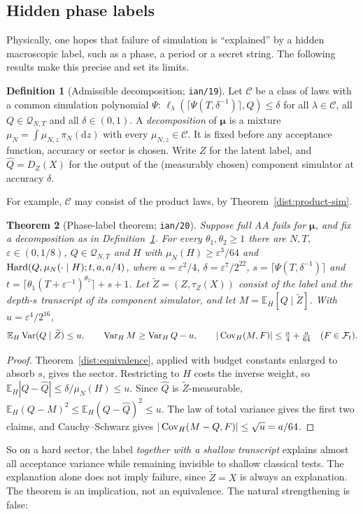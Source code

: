 \documentclass[11pt]{article}
\newtheorem{theorem}{Theorem}[section]
\theoremstyle{definition}\newtheorem{definition}[theorem]{Definition}
\theoremstyle{remark}\newtheorem{remark}[theorem]{Remark}
\newcommand{\E}{\mathbb E}\newcommand{\Prb}{\mathbb P}
\newcommand{\mc}{\mathcal}\newcommand{\eps}{\varepsilon}
\newcommand{\dd}{\mathrm d}\newcommand{\set}[1]{\left\{#1\right\}}
\begin{document}
\subsection{Hidden phase labels}\label{dist:phase}
Physically, one hopes that failure of simulation is ``explained'' by a hidden
macroscopic label, such as a phase, a period or a secret string. The following
results make this precise and set its limits.

\begin{definition}[Admissible decomposition; \texttt{ian/19}]\label{dist:decomp}
Let \(\mc C\) be a class of laws with a common simulation polynomial \(\Psi\):
\(\ell_\lambda(\lceil\Psi(T,\delta^{-1})\rceil,Q)\le\delta\) for all
\(\lambda\in\mc C\), all \(Q\in\mc Q_{N,T}\) and all \(\delta\in(0,1)\). A
\emph{decomposition} of \(\boldsymbol\mu\) is a mixture
\(\mu_N=\int\mu_{N,z}\,\pi_N(\dd z)\) with every \(\mu_{N,z}\in\mc C\). It is
fixed before any acceptance function, accuracy or sector is chosen. Write \(Z\)
for the latent label, and \(\widehat Q=D_Z(X)\) for the output of the
(measurably chosen) component simulator at accuracy \(\delta\).
\end{definition}
For example, \(\mc C\) may consist of the product laws, by
Theorem~\ref{dist:product-sim}.

\begin{theorem}[Phase-label theorem; \texttt{ian/20}]\label{dist:phase-converse}
Suppose full AA fails for \(\boldsymbol\mu\), and fix a decomposition as in
Definition~\ref{dist:decomp}. For every \(\theta_1,\theta_2\ge1\) there are
\(N,T\), \(\eps\in(0,1/8)\), \(Q\in\mc Q_{N,T}\) and \(H\) with
\(\mu_N(H)\ge\eps^3/64\) and \(\operatorname{Hard}(Q,\mu_N(\cdot\mid H);t,a,a/4)\), where
\(a=\eps^2/4\), \(\delta=\eps^7/2^{22}\),
\(s=\lceil\Psi(T,\delta^{-1})\rceil\) and
\(t=\lceil\theta_1(T+\eps^{-1})^{\theta_2}\rceil+s+1\). Let
\(\widetilde Z=(Z,\tau_Z(X))\) consist of the label and the depth-\(s\)
transcript of its component simulator, and let \(M=\E_H[Q\mid\widetilde Z]\).
With \(u=\eps^4/2^{16}\),
\[
 \E_H\Var(Q\mid\widetilde Z)\le u,\qquad
 \Var_HM\ge\Var_HQ-u,\qquad
 |\Cov_H(M,F)|\le\tfrac{a}{4}+\tfrac{a}{64}\quad(F\in\mc F_t).
\]
\end{theorem}
\begin{proof}
Theorem~\ref{dist:equivalence}, applied with budget constants enlarged to absorb
\(s\), gives the sector. Restricting to \(H\) costs the inverse weight, so
\(\E_H|Q-\widehat Q|\le\delta/\mu_N(H)\le u\). Since \(\widehat Q\) is
\(\widetilde Z\)-measurable,
\(\E_H(Q-M)^2\le\E_H(Q-\widehat Q)^2\le u\). The law of total variance gives the
first two claims, and Cauchy--Schwarz gives
\(|\operatorname{Cov}_H(M-Q,F)|\le\sqrt u=a/64\).
\end{proof}
So on a hard sector, the label \emph{together with a shallow transcript}
explains almost all acceptance variance while remaining invisible to shallow
classical tests. The explanation alone does not imply failure, since
\(\widetilde Z=X\) is always an explanation. The theorem is an implication, not
an equivalence. The natural strengthening is false:
\end{document}
